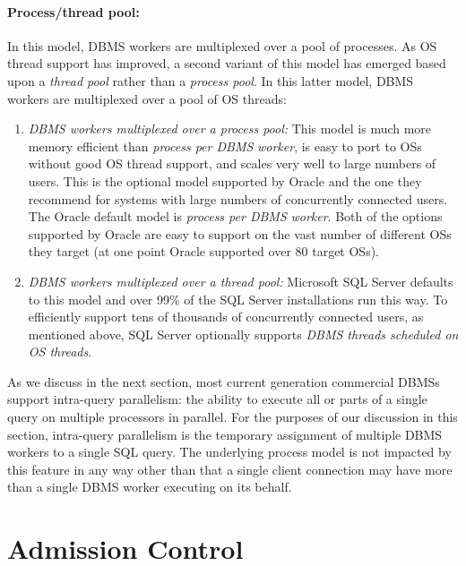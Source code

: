 \documentclass[b5paper,11pt,twoside,openright]{book}
\begin{document}
\paragraph{Process/thread pool:}

In this model, DBMS workers are multiplexed over a pool of processes. As
OS thread support has improved, a second variant of this model
has emerged based upon a \emph{thread pool} rather than a \emph{process
pool}. In this latter model, DBMS workers are multiplexed over a pool of
OS threads:

\begin{enumerate}
\def\labelenumi{\arabic{enumi}.}
\item
  \emph{DBMS workers multiplexed over a process pool:} This model is
  much more memory efficient than \emph{process per DBMS} \emph{worker},
  is easy to port to OSs without good OS thread support, and scales
  very well to large numbers of users. This is the optional model
  supported by Oracle and the one they recommend for systems with large
  numbers of concurrently connected users. The Oracle default model is
  \emph{process per DBMS} \emph{worker}. Both of the options supported
  by Oracle are easy to support on the vast number of different OSs they
  target (at one point Oracle supported over 80 target OSs).
\item
  \emph{DBMS workers multiplexed over a thread pool:} Microsoft SQL
  Server defaults to this model and over 99\% of the SQL Server
  installations run this way. To efficiently support tens of thousands
  of concurrently connected users, as mentioned above, SQL Server
  optionally supports \emph{DBMS threads scheduled on OS threads}.
\end{enumerate}

As we discuss in the next section, most current generation commercial
DBMSs support intra-query parallelism: the ability to execute all or
parts of a single query on multiple processors in parallel. For the
purposes of our discussion in this section, intra-query parallelism is
the temporary assignment of multiple DBMS workers to a single SQL query.
The underlying process model is not impacted by this feature in any way
other than that a single client connection may have more than a single
DBMS worker executing on its behalf.

\hypertarget{admission-control}{%
\section{Admission Control}\label{admission-control}}
\end{document}
